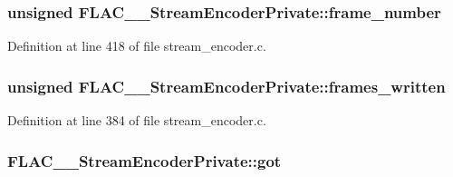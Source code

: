 \subsubsection[{\texorpdfstring{frame\+\_\+number}{frame_number}}]{\setlength{\rightskip}{0pt plus 5cm}unsigned F\+L\+A\+C\+\_\+\+\_\+\+Stream\+Encoder\+Private\+::frame\+\_\+number}\hypertarget{struct_f_l_a_c_____stream_encoder_private_a73dce3679edc4c743854baf57955e4d5}{}\label{struct_f_l_a_c_____stream_encoder_private_a73dce3679edc4c743854baf57955e4d5}


Definition at line 418 of file stream\+\_\+encoder.\+c.

\subsubsection[{\texorpdfstring{frames\+\_\+written}{frames_written}}]{\setlength{\rightskip}{0pt plus 5cm}unsigned F\+L\+A\+C\+\_\+\+\_\+\+Stream\+Encoder\+Private\+::frames\+\_\+written}\hypertarget{struct_f_l_a_c_____stream_encoder_private_a41114a347bfc3c1cec8e23bf650f95d1}{}\label{struct_f_l_a_c_____stream_encoder_private_a41114a347bfc3c1cec8e23bf650f95d1}


Definition at line 384 of file stream\+\_\+encoder.\+c.

\subsubsection[{\texorpdfstring{got}{got}}]{ F\+L\+A\+C\+\_\+\+\_\+\+Stream\+Encoder\+Private\+::got}\hypertarget{struct_f_l_a_c_____stream_encoder_private_a9f7322e8f52be0f4814fd287c292cbe6}{}\label{struct_f_l_a_c_____stream_encoder_private_a9f7322e8f52be0f4814fd287c292cbe6}


